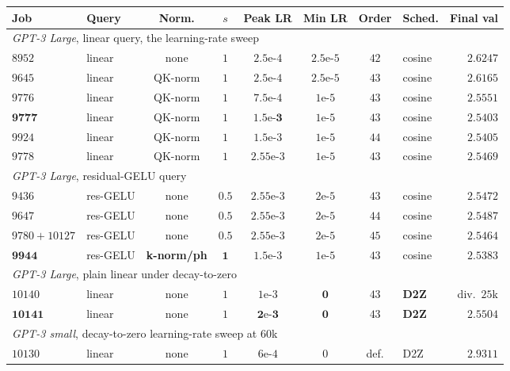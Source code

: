 \documentclass[mlabstract,onecolumn]{jmlr}
\begin{document}
\begin{table}[ht]
\centering
\footnotesize
\setlength{\tabcolsep}{4pt}
\begin{tabular}{llccccclr}
\toprule
Job & Query & Norm. & $s$ & Peak LR & Min LR & Order & Sched. & Final val \\
\midrule
\multicolumn{9}{l}{\emph{GPT-3 Large}, linear query, the learning-rate sweep} \\
$8952$  & linear   & none    & $1$ & $2.5$e-$4$  & $2.5$e-$5$ & $42$ & cosine & $2.6247$ \\
$9645$  & linear   & QK-norm & $1$ & $2.5$e-$4$  & $2.5$e-$5$ & $43$ & cosine & $2.6165$ \\
$9776$  & linear   & QK-norm & $1$ & $7.5$e-$4$  & $1$e-$5$   & $43$ & cosine & $2.5551$ \\
$\mathbf{9777}$ & linear & QK-norm & $1$ & $\mathbf{1.5}$e-$\mathbf{3}$ & $1$e-$5$ & $43$ & cosine & $\mathbf{2.5403}$ \\
$9924$  & linear   & QK-norm & $1$ & $1.5$e-$3$  & $1$e-$5$   & $44$ & cosine & $2.5405$ \\
$9778$  & linear   & QK-norm & $1$ & $2.55$e-$3$ & $1$e-$5$   & $43$ & cosine & $2.5469$ \\
\midrule
\multicolumn{9}{l}{\emph{GPT-3 Large}, residual-GELU query} \\
$9436$  & res-GELU & none    & $0.5$ & $2.55$e-$3$ & $2$e-$5$ & $43$ & cosine & $2.5472$ \\
$9647$  & res-GELU & none    & $0.5$ & $2.55$e-$3$ & $2$e-$5$ & $44$ & cosine & $2.5487$ \\
$9780{+}10127$ & res-GELU & none & $0.5$ & $2.55$e-$3$ & $2$e-$5$ & $45$ & cosine & $2.5464$ \\
$\mathbf{9944}$ & res-GELU & \textbf{k-norm/ph} & $\mathbf{1}$ & $1.5$e-$3$ & $1$e-$5$ & $43$ & cosine & $\mathbf{2.5383}$ \\
\midrule
\multicolumn{9}{l}{\emph{GPT-3 Large}, plain linear under decay-to-zero} \\
$10140$ & linear   & none    & $1$ & $1$e-$3$    & $\mathbf{0}$ & $43$ & \textbf{D2Z} & div.\ $25$k \\
$\mathbf{10141}$ & linear & none & $1$ & $\mathbf{2}$e-$\mathbf{3}$ & $\mathbf{0}$ & $43$ & \textbf{D2Z} & $\mathbf{2.5504}$ \\
\midrule
\multicolumn{9}{l}{\emph{GPT-3 small}, decay-to-zero learning-rate sweep at $60$k} \\
$10130$ & linear   & none    & $1$ & $6$e-$4$    & $0$ & def. & D2Z & $2.9311$ \\

\end{tabular}
\end{table}
\end{document}
